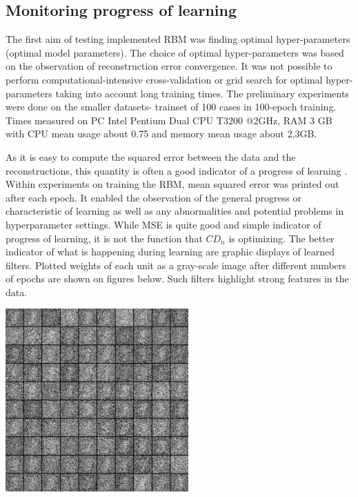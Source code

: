 \documentclass[a4paper]{scrartcl}
\begin{document}
\subsection{Monitoring progress of learning}
The first aim of testing implemented RBM was finding optimal hyper-parameters (optimal model parameters). The choice of optimal hyper-parameters was based on the observation of reconstruction error convergence. It was not possible to perform computational-intensive cross-validation or grid search for optimal hyper-parameters taking into account long training times. The preliminary experiments were done on the smaller datasets- trainset of 100 cases in 100-epoch training. Times measured on PC Intel Pentium Dual CPU T3200 @2GHz, RAM 3 GB with CPU mean usage about 0.75 and memory mean usage about 2,3GB.
\par As it is easy to compute the squared error between the data and the reconstructions, this quantity is often a good indicator of a progress of learning \cite{Hinton}. Within experiments on training the RBM, mean squared error was printed out after each epoch. It enabled the observation of the general progress or characteristic of learning as well as any abnormalities and potential problems in hyperparameter settings. 
While MSE is quite good and simple indicator of progress of learning, it is not the function that $CD_n$ is optimizing. The better indicator of what is happening during learning are graphic displays of learned filters. Plotted weights of each unit as a gray-scale image after different numbers of epochs are shown on figures below. Such filters highlight strong features in the data.
\vspace{1em}
\par
\begin{minipage}[t]{0.5\textwidth}
	\begin{center}
	\includegraphics[width=7cm]{images/filtry_1epoch_50train.png}
	\vspace{-1em}
	\end{center}
\end{minipage}
\end{document}
